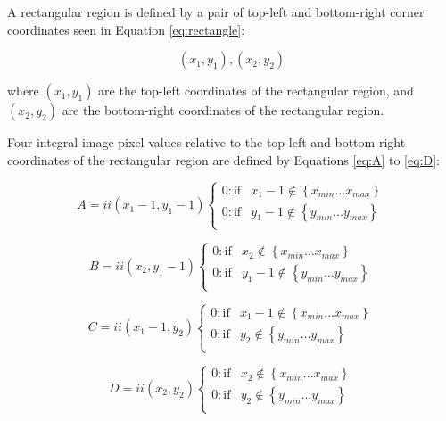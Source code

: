 A rectangular region is defined by a pair of top-left and bottom-right corner coordinates seen in Equation \ref{eq:rectangle}:

\begin{equation} \label{eq:rectangle}
(x_1, y_1), (x_2, y_2)
\end{equation}

where $(x_1, y_1)$ are the top-left coordinates of the rectangular region, and 
$(x_2, y_2)$ are the bottom-right coordinates of the rectangular region.

Four integral image pixel values relative to the top-left and bottom-right coordinates of the rectangular region are defined by Equations \ref{eq:A} to \ref{eq:D}:

\begin{equation} \label{eq:A}
A = ii(x_1 - 1, y_1 - 1)
    \begin{cases}
        0: \text{if} & x_1 - 1 \not\in \left\{ x_{min} \dots x_{max} \right\} \\
        0: \text{if} & y_1 - 1 \not\in \left\{ y_{min} \dots y_{max} \right\} \\
    \end{cases}
\end{equation}

\begin{equation} \label{eq:B}
B = ii(x_2, y_1 - 1)
    \begin{cases}
        0: \text{if} & x_2 \not\in \left\{ x_{min} \dots x_{max} \right\} \\
        0: \text{if} & y_1 - 1 \not\in \left\{ y_{min} \dots y_{max} \right\} \\
    \end{cases}
\end{equation}

\begin{equation} \label{eq:C}
C = ii(x_1 - 1, y_2)
    \begin{cases}
        0: \text{if} & x_1 - 1 \not\in \left\{ x_{min} \dots x_{max} \right\} \\
        0: \text{if} & y_2 \not\in \left\{ y_{min} \dots y_{max} \right\} \\
    \end{cases}
\end{equation}

\begin{equation} \label{eq:D}
D = ii(x_2, y_2)
    \begin{cases}
        0: \text{if} & x_2 \not\in \left\{ x_{min} \dots x_{max} \right\} \\
        0: \text{if} & y_2 \not\in \left\{ y_{min} \dots y_{max} \right\} \\
    \end{cases}
\end{equation}

